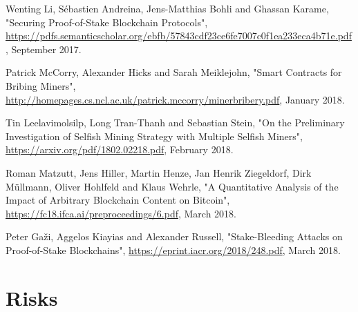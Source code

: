 \documentclass[11pt,a4paper]{article}
\begin{document}
\begin{thebibliography}{9}
Wenting Li, Sébastien Andreina, Jens-Matthias Bohli and Ghassan Karame,
"Securing Proof-of-Stake Blockchain Protocols",
\url{https://pdfs.semanticscholar.org/ebfb/57843cdf23ce6fe7007c0f1ea233eca4b71e.pdf},
September 2017.

Patrick McCorry, Alexander Hicks and Sarah Meiklejohn,
"Smart Contracts for Bribing Miners",
\url{http://homepages.cs.ncl.ac.uk/patrick.mccorry/minerbribery.pdf},
January 2018.

Tin Leelavimolsilp, Long Tran-Thanh and Sebastian Stein,
"On the Preliminary Investigation of Selfish Mining Strategy with Multiple Selfish Miners",
\url{https://arxiv.org/pdf/1802.02218.pdf},
February 2018.

Roman Matzutt, Jens Hiller, Martin Henze, Jan Henrik Ziegeldorf, Dirk Müllmann, Oliver Hohlfeld and Klaus Wehrle,
"A Quantitative Analysis of the Impact of Arbitrary Blockchain Content on Bitcoin",
\url{https://fc18.ifca.ai/preproceedings/6.pdf},
March 2018.

Peter Gaži, Aggelos Kiayias and Alexander Russell,
"Stake-Bleeding Attacks on Proof-of-Stake Blockchains",
\url{https://eprint.iacr.org/2018/248.pdf},
March 2018.

\end{thebibliography}

\newpage
\appendix

\section{Risks}
\end{document}
